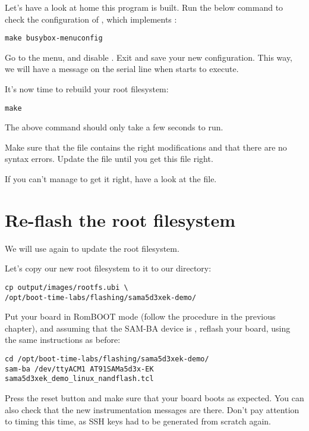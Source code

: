Let's have a look at home this program is built. Run the below command
to check the configuration of , which implements
:

\begin{verbatim}
make busybox-menuconfig
\end{verbatim}

Go to the  menu, and disable . Exit and save your new configuration. This way, we will have
a message on the serial line when  starts to execute.

It's now time to rebuild your root filesystem:
\begin{verbatim}
make
\end{verbatim}

The above command should only take a few seconds to run.

Make sure that the  file
contains the right modifications and that there are no syntax errors.
Update the  file until
you get this file right.

If you can't manage to get it right, have a look at the
 file.

\section{Re-flash the root filesystem}

We will use  again to update the root filesystem.

Let's copy our new root filesystem to it to our  directory:

\begin{verbatim}
cp output/images/rootfs.ubi \
/opt/boot-time-labs/flashing/sama5d3xek-demo/
\end{verbatim}

Put your board in RomBOOT mode (follow the procedure in the previous
chapter), and assuming that the SAM-BA device is \code{/dev/ttyACM1},
reflash your board, using the same instructions as before:

\begin{verbatim}
cd /opt/boot-time-labs/flashing/sama5d3xek-demo/
sam-ba /dev/ttyACM1 AT91SAMa5d3x-EK sama5d3xek_demo_linux_nandflash.tcl
\end{verbatim}

Press the reset button and make sure that your board boots as
expected. You can also check that the new instrumentation messages are
there. Don't pay attention to timing this time, as SSH keys had to be
generated from scratch again.

